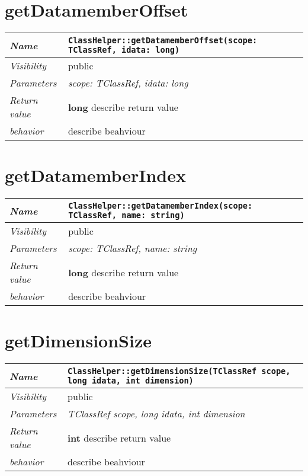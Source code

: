  \section{getDatamemberOffset}
\begin{longtable}{p{3cm} @{\hskip 1cm} p{12cm}}
 \hline
\textit{Name} & \texttt{ClassHelper::getDatamemberOffset(scope: TClassRef, idata: long)}\\
\hline
 \textit{Visibility} & public\\
\hline
\textit{Parameters} & \textit{scope: TClassRef, idata: long}\\
\hline
\textit{Return value} & \textbf{ long} describe return value\\
  \hline
 \textit{behavior} & describe beahviour \\
\hline
\end{longtable} \pagebreak
 \section{getDatamemberIndex}
\begin{longtable}{p{3cm} @{\hskip 1cm} p{12cm}}
 \hline
\textit{Name} & \texttt{ClassHelper::getDatamemberIndex(scope: TClassRef, name: string)}\\
\hline
 \textit{Visibility} & public\\
\hline
\textit{Parameters} & \textit{scope: TClassRef, name: string}\\
\hline
\textit{Return value} & \textbf{ long} describe return value\\
  \hline
 \textit{behavior} & describe beahviour \\
\hline
\end{longtable} \pagebreak
 \section{getDimensionSize}
\begin{longtable}{p{3cm} @{\hskip 1cm} p{12cm}}
 \hline
\textit{Name} & \texttt{ClassHelper::getDimensionSize(TClassRef scope, long idata, int dimension)}\\
\hline
 \textit{Visibility} & public\\
\hline
\textit{Parameters} & \textit{TClassRef scope, long idata, int dimension}\\
\hline
\textit{Return value} & \textbf{ int} describe return value\\
  \hline
 \textit{behavior} & describe beahviour \\
\hline
\end{longtable} \pagebreak
